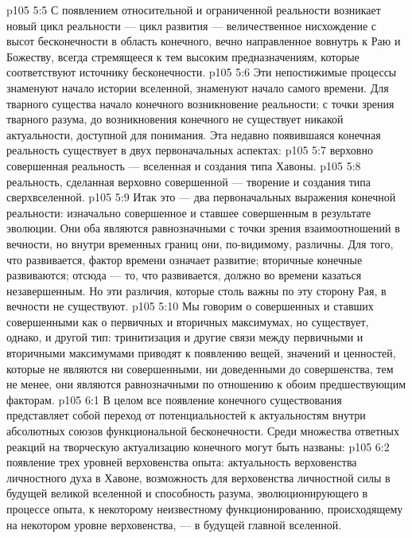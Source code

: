 \vs p105 5:5 С появлением относительной и ограниченной реальности возникает новый цикл реальности --- цикл развития --- величественное нисхождение с высот бесконечности в область конечного, вечно направленное вовнутрь к Раю и Божеству, всегда стремящееся к тем высоким предназначениям, которые соответствуют источнику бесконечности.
\vs p105 5:6 Эти непостижимые процессы знаменуют начало истории вселенной, знаменуют начало самого времени. Для тварного существа начало конечного  возникновение реальности; с точки зрения тварного разума, до возникновения конечного не существует никакой актуальности, доступной для понимания. Эта недавно появившаяся конечная реальность существует в двух первоначальных аспектах:
\vs p105 5:7 \bibnobreakspace {} верховно совершенная реальность --- вселенная и создания типа Хавоны.
\vs p105 5:8 \bibnobreakspace {} реальность, сделанная верховно совершенной --- творение и создания типа сверхвселенной.
\vs p105 5:9 \pc Итак это --- два первоначальных выражения конечной реальности: изначально совершенное и ставшее совершенным в результате эволюции. Они оба являются равнозначными с точки зрения взаимоотношений в вечности, но внутри временных границ они, по\hyp{}видимому, различны. Для того, что развивается, фактор времени означает развитие; вторичные конечные развиваются; отсюда --- то, что развивается, должно во времени казаться незавершенным. Но эти различия, которые столь важны по эту сторону Рая, в вечности не существуют.
\vs p105 5:10 Мы говорим о совершенных и ставших совершенными как о первичных и вторичных максимумах, но существует, однако, и другой тип: тринитизация и другие связи между первичными и вторичными максимумами приводят к появлению  вещей, значений и ценностей, которые не являются ни совершенными, ни доведенными до совершенства, тем не менее, они являются равнозначными по отношению к обоим предшествующим факторам.
\vs p105 6:1 В целом все появление конечного существования представляет собой переход от потенциальностей к актуальностям внутри абсолютных союзов функциональной бесконечности. Среди множества ответных реакций на творческую актуализацию конечного могут быть названы:
\vs p105 6:2 \bibnobreakspace {} появление трех уровней верховенства опыта: актуальность верховенства личностного духа в Хавоне, возможность для верховенства личностной силы в будущей великой вселенной и способность разума, эволюционирующего в процессе опыта, к некоторому неизвестному функционированию, происходящему на некотором уровне верховенства, --- в будущей главной вселенной.
